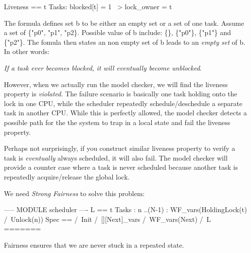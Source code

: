 \begin{tla}
Liveness == 
    \A t \in Tasks:
        blocked[t] = 1 ~> lock_owner = t
\end{tla}
\begin{tlatex}
%
%
%
\end{tlatex}
\newline

The formula defines set b to be either an empty set or a set of one task. Assume
a set of \{"p0", "p1", "p2\}. Possible value of b include: \{\}, \{"p0"\},
\{"p1"\} and \{"p2"\}. The fomula then states an non empty set of b leads to an
\textit{empty set} of b. In other words: \newline

\textit{If a task ever becomes blocked, it will eventually become unblocked}.\newline

However, when we actually run the model checker, we will find the liveness
property is \textit{violated}. The failure scenario is basically one task
holding onto the lock in one CPU, while the scheduler repeatedly
schedule/deschedule a separate task in another CPU. While this is perfectly
allowed, the model checker detects a possible path for the the system to trap in
a local state and fail the liveness property.\newline 

Perhaps not surprisingly, if you construct similar liveness property to verify 
a task is \textit{eventually} always scheduled, it will also fail. The model
checker will provide a counter case where a task is never scheduled because
another task is repeatedly acquire/release the global lock.\newline

We need \textit{Strong Fairness} to solve this problem:
\begin{tla}
----- MODULE scheduler ---- 
L ==
    \A t \in Tasks :
        \A n ..(N-1) :
            WF_vars(HoldingLock(t) /\ Unlock(n))
Spec ==
  /\ Init
  /\ [][Next]_vars
  /\ WF_vars(Next)
  /\ L 
======= 
\end{tla}
\begin{tlatex}
\@x{}\moduleLeftDash{}\moduleRightDash\@xx{}%
%
%
%
%
%
%
%
%
%
\@x{}\bottombar\@xx{}%
\end{tlatex}
\newline

Fairness ensures that we are never stuck in a repeated state.

% 
